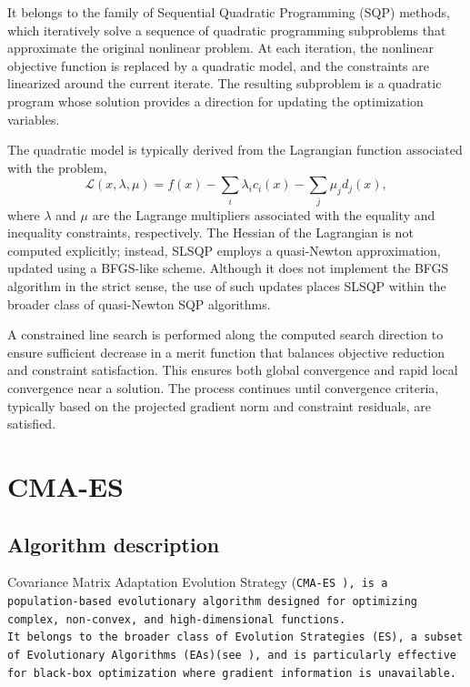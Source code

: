 It belongs to the family of Sequential Quadratic Programming (SQP) methods, which iteratively solve a sequence of quadratic programming subproblems that approximate the original nonlinear problem. 
At each iteration, the nonlinear objective function is replaced by a quadratic model, and the constraints are linearized around the current iterate. 
The resulting subproblem is a quadratic program whose solution provides a direction for updating the optimization variables.

The quadratic model is typically derived from the Lagrangian function associated with the problem,
\begin{equation}
\mathcal{L}(x, \lambda, \mu) = f(x) - \sum_{i} \lambda_i c_i(x) - \sum_{j} \mu_j d_j(x),
\end{equation}
where $ \lambda $ and $ \mu $ are the Lagrange multipliers associated with the equality and inequality constraints, respectively. 
The Hessian of the Lagrangian is not computed explicitly; instead, SLSQP employs a quasi-Newton approximation, updated using a BFGS-like scheme. 
Although it does not implement the BFGS algorithm in the strict sense, the use of such updates places SLSQP within the broader class of quasi-Newton SQP algorithms.

A constrained line search is performed along the computed search direction to ensure sufficient decrease in a merit function that balances objective reduction and constraint satisfaction. 
This ensures both global convergence and rapid local convergence near a solution. 
The process continues until convergence criteria, typically based on the projected gradient norm and constraint residuals, are satisfied.



\section{CMA-ES}

\subsection{Algorithm description}
Covariance Matrix Adaptation Evolution Strategy (\tt{CMA-ES} \cite{cmaessimplepractical}), is a population-based evolutionary algorithm designed for optimizing complex, non-convex, and high-dimensional functions.\\
It belongs to the broader class of Evolution Strategies (ES), a subset of Evolutionary Algorithms (EAs)(see \cite{sloss20192019evolutionaryalgorithmsreview}), and is particularly effective for black-box optimization where gradient information is unavailable.

